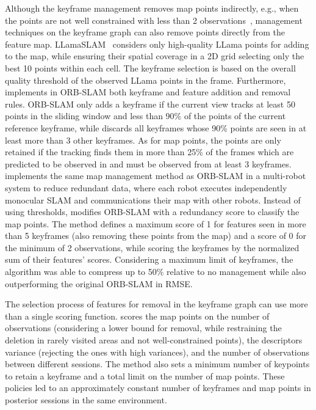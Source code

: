 Although the keyframe management removes map points indirectly, e.g., when the points are not well constrained with less than 2 observations~\parencite{schmuck-chli:2019:00071}, management techniques on the keyframe graph can also remove points directly from the feature map.
LLamaSLAM~\parencite{luthardt-et-al:2018:8569323} considers only high-quality LLama points for adding to the map, while ensuring their spatial coverage in a 2D grid selecting only the best 10 points within each cell. The keyframe selection is based on the overall quality threshold of the observed LLama points in the frame.
Furthermore, \cite{mur-artal-et-al:2015:2463671} implements in ORB-SLAM both keyframe and feature addition and removal rules. ORB-SLAM only adds a keyframe if the current view tracks at least 50 points in the sliding window and less than 90\% of the points of the current reference keyframe, while discards all keyframes whose 90\% points are seen in at least more than 3 other keyframes. As for map points, the points are only retained if the tracking finds them in more than 25\% of the frames which are predicted to be observed in and must be observed from at least 3 keyframes.
\cite{zhang-et-al:2018:1729881418780178} implements the same map management method as ORB-SLAM in a multi-robot system to reduce redundant data, where each robot executes independently monocular SLAM and communications their map with other robots.
Instead of using thresholds, \cite{schmuck-chli:2019:00071} modifies ORB-SLAM with a redundancy score to classify the map points. The method defines a maximum score of 1 for features seen in more than 5 keyframes (also removing these points from the map) and a score of 0 for the minimum of 2 observations, while scoring the keyframes by the normalized sum of their features' scores. Considering a maximum limit of keyframes, the algorithm was able to compress up to 50\% relative to no management while also outperforming the original ORB-SLAM in RMSE.

The selection process of features for removal in the keyframe graph can use more than a single scoring function.
\cite{dymczyk-et-al:2015:7139575} scores the map points on the number of observations (considering a lower bound for removal, while restraining the deletion in rarely visited areas and not well-constrained points), the descriptors variance (rejecting the ones with high variances), and the number of observations between different sessions. The method also sets a minimum number of keypoints to retain a keyframe and a total limit on the number of map points. These policies led to an approximately constant number of keyframes and map points in posterior sessions in the same environment.


